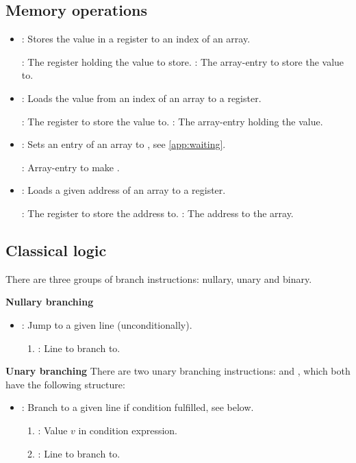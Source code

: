 \subsection{Memory operations}
\begin{itemize}
  \item {}: Stores the value in a register to an index of an array.

        : The register holding the value to store.
        : The array-entry to store the value to.
  \item {}: Loads the value from an index of an array to a register.

        : The register to store the value to.
        : The array-entry holding the value.
  \item {}: Sets an entry of an array to , see \cref{app:waiting}.

        : Array-entry to make .
  \item {}: Loads a given address of an array to a register.
  
        : The register to store the address to.
        : The address to the array.
\end{itemize}

\subsection{Classical logic}


There are three groups of branch instructions: nullary, unary and binary.

\textbf{Nullary branching}
\begin{itemize}
  \item {}: Jump to a given line (unconditionally).
        \begin{enumerate}
          \item \IMMEDIATE: Line to branch to.
        \end{enumerate}
\end{itemize}

\textbf{Unary branching}
There are two unary branching instructions:  and , which both have the following structure:
\begin{itemize}
  \item {}: Branch to a given line if condition fulfilled, see below.
        \begin{enumerate}
          \item \REGISTER: Value $v$ in condition expression.
          \item \IMMEDIATE: Line to branch to.
        \end{enumerate}
\end{itemize}

